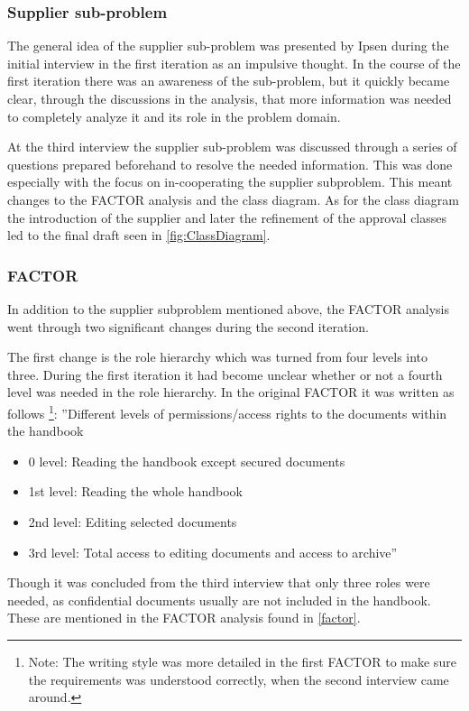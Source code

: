 \subsubsection*{Supplier sub-problem} 
The general idea of the supplier sub-problem was presented by Ipsen during the initial interview in the first iteration as an impulsive thought.
In the course of the first iteration there was an awareness of the sub-problem, but it quickly became clear, through the discussions in the analysis, that more information was needed to completely analyze it and its role in the problem domain.

At the third interview the supplier sub-problem was discussed through a series of questions prepared beforehand to resolve the needed information.
This was done especially with the focus on in-cooperating the supplier subproblem.
This meant changes to the FACTOR analysis and the class diagram.
As for the class diagram the introduction of the supplier and later the refinement of the approval classes led to the final draft seen in \cref{fig:ClassDiagram}.

\subsubsection*{FACTOR}
In addition to the supplier subproblem mentioned above, the FACTOR analysis went through two significant changes during the second iteration.

The first change is the role hierarchy which was turned from four levels into three.
During the first iteration it had become unclear whether or not a fourth level was needed in the role hierarchy.
In the original FACTOR it was written as follows
\footnote{Note: The writing style was more detailed in the first FACTOR to make sure the requirements was understood correctly, when the second interview came around.}:
\newline
''Different levels of permissions/access rights to the documents within the handbook
\begin{itemize}
	\item 
	0 level:
	Reading the handbook except secured documents
	\item 
	1st level:
	Reading the whole handbook
	\item 
	2nd level:
	Editing selected documents
	\item 
	3rd level:
	Total access to editing documents and access to archive''
\end{itemize}

Though it was concluded from the third interview that only three roles were needed, as confidential documents usually are not included in the handbook.
These are mentioned in the FACTOR analysis found in \cref{factor}.

